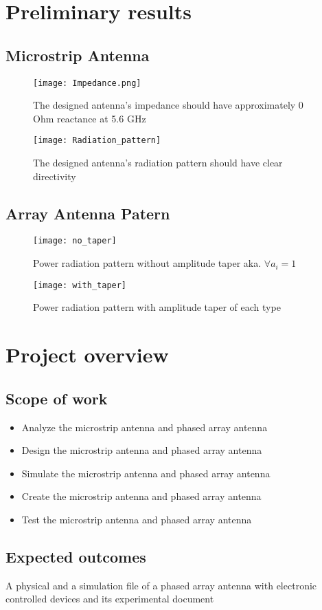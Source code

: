 \pagebreak

\section{Preliminary results}
  \subsection{Microstrip Antenna}
    \begin{figure}[h]
      \texttt{[image: Impedance.png]}
      \centering
      \caption{The designed antenna's impedance should have approximately 0 Ohm reactance at 5.6 GHz}
      \label{fig:1}
    \end{figure}

    \begin{figure}[h]
      \texttt{[image: Radiation\_pattern]}
      \centering
      \caption{The designed antenna's radiation pattern should have clear directivity}
      \label{fig:2}
    \end{figure}

\pagebreak

  \subsection{Array Antenna Patern}
    \begin{figure}[h]
      \texttt{[image: no\_taper]}
      \centering
      \caption{Power radiation pattern without amplitude taper aka. $\forall a_{i} = 1$}
      \label{fig:3}
    \end{figure}

    \begin{figure}[h]
      \texttt{[image: with\_taper]}
      \centering
      \caption{Power radiation pattern with amplitude taper of each type}
      \label{fig:4}
    \end{figure}

\pagebreak

\section{Project overview}
  \subsection{Scope of work}
    \begin{itemize}
      \item Analyze the microstrip antenna and phased array antenna
      \item Design the microstrip antenna and phased array antenna
      \item Simulate the microstrip antenna and phased array antenna
      \item Create the microstrip antenna and phased array antenna
      \item Test the microstrip antenna and phased array antenna
    \end{itemize}

  \subsection{Expected outcomes}
    \indent A physical and a simulation file of a phased array antenna with electronic controlled devices and its experimental document

  \newpage

   
  